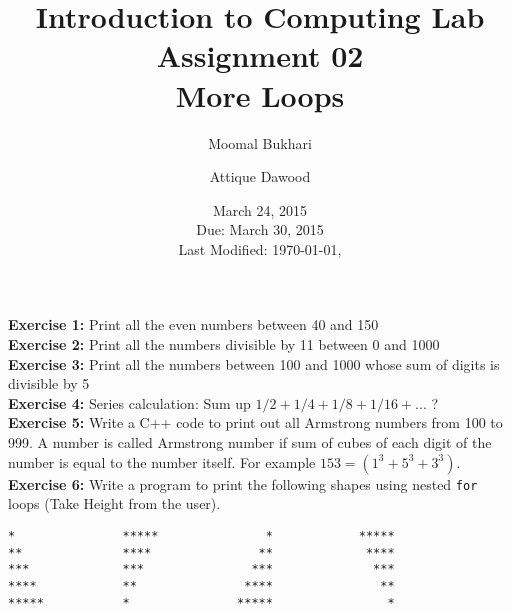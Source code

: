 \documentclass[12pt,a4paper]{article}
\title{Introduction to Computing Lab\\Assignment 02\\More Loops}
\author{Moomal Bukhari\and Attique Dawood}
\date{March 24, 2015\\Due: March 30, 2015\\[0.2cm] Last Modified: \today, \currenttime}
\begin{document}
\maketitle
\noindent \textbf{Exercise 1:} Print all the even numbers between 40 and 150\\[0.2cm]
\noindent \textbf{Exercise 2:} Print all the numbers divisible by 11 between 0 and 1000\\[0.2cm]
\noindent \textbf{Exercise 3:} Print all the numbers between 100 and 1000 whose sum of digits is divisible by 5\\[0.2cm]
\noindent \textbf{Exercise 4:} Series calculation: Sum up $1/2 + 1/4 + 1/8 + 1/16 + ...$ ?\\[0.2cm]
\noindent \textbf{Exercise 5:} Write a C++ code to print out all Armstrong numbers from 100 to 999. A number is called Armstrong number if sum of cubes of each digit of the number is equal to the number itself. For example $153=(1^3+5^3+3^3)$.\\[0.2cm]
\noindent \textbf{Exercise 6:} Write a program to print the following shapes using nested \verb|for| loops (Take Height from the user). 
\begin{verbatim}
*           	*****               *       	 *****
**          	****               **       	  ****
***         	***               ***       	   ***
****        	**               ****       	    **
*****       	*               *****       	     *
\end{verbatim}
\end{document}
